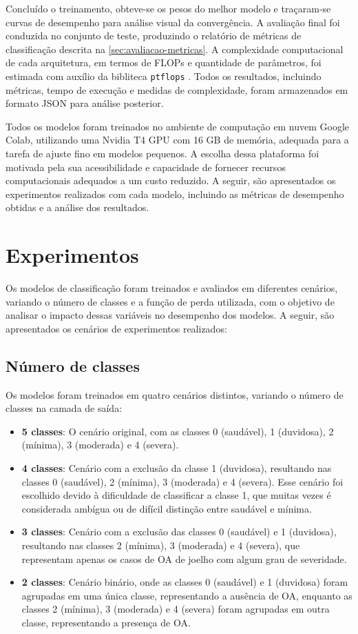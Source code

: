 Concluído o treinamento, obteve-se os pesos do melhor modelo e traçaram‑se curvas de desempenho para análise visual da convergência. A avaliação final foi conduzida no conjunto de teste, produzindo o relatório de métricas de classificação descrita na \autoref{sec:avaliacao-metricas}. A complexidade computacional de cada arquitetura, em termos de FLOPs e quantidade de parâmetros, foi estimada com auxílio da bibliteca \texttt{ptflops} \citep{ptflops}. Todos os resultados, incluindo métricas, tempo de execução e medidas de complexidade, foram armazenados em formato JSON para análise posterior.

Todos os modelos foram treinados no ambiente de computação em nuvem Google Colab, utilizando uma Nvidia T4 GPU com 16 GB de memória, adequada para a tarefa de ajuste fino em modelos pequenos. A escolha dessa plataforma foi motivada pela sua acessibilidade e capacidade de fornecer recursos computacionais adequados a um custo reduzido. A seguir, são apresentados os experimentos realizados com cada modelo, incluindo as métricas de desempenho obtidas e a análise dos resultados.

\section{Experimentos}

Os modelos de classificação foram treinados e avaliados em diferentes cenários, variando o número de classes e a função de perda utilizada, com o objetivo de analisar o impacto dessas variáveis no desempenho dos modelos. A seguir, são apresentados os cenários de experimentos realizados:

\subsection{Número de classes}

Os modelos foram treinados em quatro cenários distintos, variando o número de classes na camada de saída:

\begin{itemize}
    \item \textbf{5 classes}: O cenário original, com as classes 0 (saudável), 1 (duvidosa), 2 (mínima), 3 (moderada) e 4 (severa).
    \item \textbf{4 classes}: Cenário com a exclusão da classe 1 (duvidosa), resultando nas classes 0 (saudável), 2 (mínima), 3 (moderada) e 4 (severa). Esse cenário foi escolhido devido à dificuldade de classificar a classe 1, que muitas vezes é considerada ambígua ou de difícil distinção entre saudável e mínima.
    \item \textbf{3 classes}: Cenário com a exclusão das classes 0 (saudável) e 1 (duvidosa), resultando nas classes 2 (mínima), 3 (moderada) e 4 (severa), que representam apenas os casos de OA de joelho com algum grau de severidade.
    \item \textbf{2 classes}: Cenário binário, onde as classes 0 (saudável) e 1 (duvidosa) foram agrupadas em uma única classe, representando a ausência de OA, enquanto as classes 2 (mínima), 3 (moderada) e 4 (severa) foram agrupadas em outra classe, representando a presença de OA.
\end{itemize}

